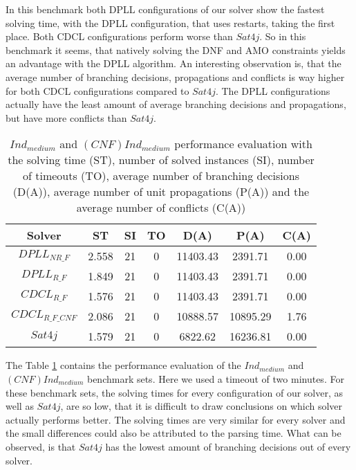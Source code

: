 In this benchmark both DPLL configurations of our solver show the fastest solving time, with the DPLL configuration, that uses restarts, taking the first place. Both CDCL configurations perform worse than $Sat4j$. So in this benchmark it seems, that natively solving the DNF and AMO constraints yields an advantage with the DPLL algorithm. An interesting observation is, that the average number of branching decisions, propagations and conflicts is way higher for both CDCL configurations compared to $Sat4j$. The DPLL configurations actually have the least amount of average branching decisions and propagations, but have more conflicts than $Sat4j$.

\begin{table}[!htb]
\centering
\caption[$Ind_{medium}$ and $(CNF)Ind_{medium}$ performance evaluation]{$Ind_{medium}$ and $(CNF)Ind_{medium}$ performance evaluation with the solving time (ST), number of solved instances (SI), number of timeouts (TO), average number of branching decisions (D(A)), average number of unit propagations (P(A)) and the average number of conflicts (C(A))}
\label{tab:jBenchmarks}
\begin{tabular}{|c|c|c|c|c|c|c|}
\hline
Solver & ST & SI & TO & D(A) & P(A) & C(A)\\ 
\hline
$DPLL_{NR\_F}$ & 2.558 & 21 & 0 & 11403.43 & 2391.71 & 0.00 \\ 
\hline
$DPLL_{R\_F}$ & 1.849 & 21 & 0 & 11403.43 & 2391.71 & 0.00 \\ 
\hline
$CDCL_{R\_F}$ & 1.576 & 21 & 0 & 11403.43 & 2391.71 & 0.00 \\ 
\hline
$CDCL_{R\_F\_CNF}$ & 2.086 & 21 & 0 & 10888.57 & 10895.29 & 1.76 \\ 
\hline
$Sat4j$ & 1.579 & 21 & 0 & 6822.62 & 16236.81 & 0.00 \\ 
\hline
\end{tabular}
\end{table}

The Table \ref{tab:jBenchmarks} contains the performance evaluation of the $Ind_{medium}$ and $(CNF)Ind_{medium}$ benchmark sets. Here we used a timeout of two minutes. For these benchmark sets, the solving times for every configuration of our solver, as well as $Sat4j$, are so low, that it is difficult to draw conclusions on which solver actually performs better. The solving times are very similar for every solver and the small differences could also be attributed to the parsing time. What can be observed, is that $Sat4j$ has the lowest amount of branching decisions out of every solver.

